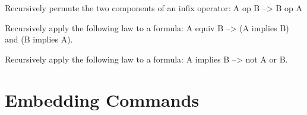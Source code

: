 \begin{description}
\item[PMUT*]  
Recursively permute the two components of an infix operator:
   A op B --> B op A

\item[SUBEQ*]  
Recursively apply the following law to a formula:
   A equiv B --> (A implies B) and (B implies A).

\item[SUBIM*]  
Recursively apply the following law to a formula:
   A implies B  --> not A or B.
\item
\end{description}

\section{Embedding Commands}

